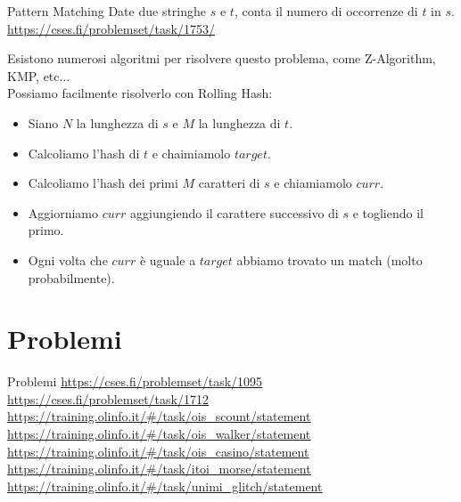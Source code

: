 \documentclass[compress]{beamer}
\begin{document}
\begin{frame}
    \begin{exampleblock}{Pattern Matching}
        Date due stringhe $s$ e $t$, conta il numero di occorrenze di $t$ in $s$.
        \vfill
        \small{\underline{\url{https://cses.fi/problemset/task/1753/}}}
    \end{exampleblock}
    \pause
    Esistono numerosi algoritmi per risolvere questo problema, come Z-Algorithm, KMP, etc...\\
    \pause
    Possiamo facilmente risolverlo con Rolling Hash:
    \begin{itemize}
        \item Siano $N$ la lunghezza di $s$ e $M$ la lunghezza di $t$.
        \item Calcoliamo l'hash di $t$ e chaimiamolo $target$.
        \item Calcoliamo l'hash dei primi $M$ caratteri di $s$ e chiamiamolo $curr$.
        \item Aggiorniamo $curr$ aggiungiendo il carattere successivo di $s$ e togliendo il primo.
        \item Ogni volta che $curr$ \`e uguale a $target$ abbiamo trovato un match (molto probabilmente).
    \end{itemize}
\end{frame}

\section{Problemi}
\begin{frame}{Problemi}
    \small{\underline{\url{https://cses.fi/problemset/task/1095}}}
    \small{\underline{\url{https://cses.fi/problemset/task/1712}}}
    \small{\underline{\url{https://training.olinfo.it/\#/task/ois_scount/statement}}}
    \small{\underline{\url{https://training.olinfo.it/\#/task/ois_walker/statement}}}
    \small{\underline{\url{https://training.olinfo.it/\#/task/ois_casino/statement}}}
    \small{\underline{\url{https://training.olinfo.it/\#/task/itoi_morse/statement}}}
    \small{\underline{\url{https://training.olinfo.it/\#/task/unimi_glitch/statement}}}
\end{frame}
\end{document}
